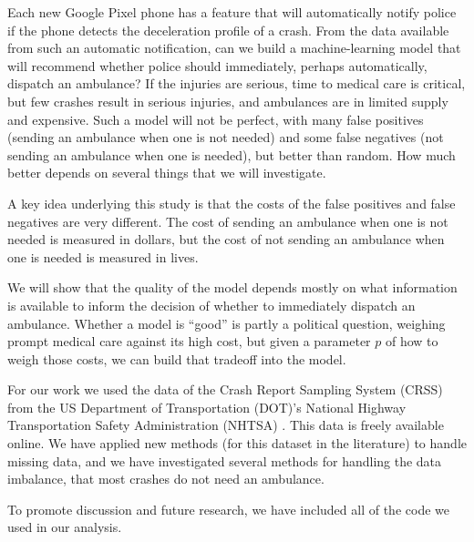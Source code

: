 Each new Google Pixel phone has a feature that will automatically notify police if the phone detects the deceleration profile of a crash.  From the data available from such an automatic notification, can we build a machine-learning model that will recommend whether police should immediately, perhaps automatically, dispatch an ambulance?  If the injuries are serious, time to medical care is critical, but few crashes result in serious injuries, and ambulances are in limited supply and expensive.  Such a model will not be perfect, with many false positives (sending an ambulance when one is not needed) and some false negatives (not sending an ambulance when one is needed), but better than random.  How much better depends on several things that we will investigate.

A key idea underlying this study is that the costs of the false positives and false negatives are very different.  The cost of sending an ambulance when one is not needed is measured in dollars, but the cost of not sending an ambulance when one is needed is measured in lives.  

We will show that the quality of the model depends mostly on what information is available to inform the decision of whether to immediately dispatch an ambulance.  Whether a model is ``good'' is partly a political question, weighing prompt medical care against its high cost, but given a parameter $p$ of how to weigh those costs, we can build that tradeoff into the model.

For our work we used the data of the Crash Report Sampling System (CRSS) from the US Department of Transportation (DOT)'s National Highway Transportation Safety Administration (NHTSA) \cite{CRSS}.  This data is freely available online.  We have applied new methods (for this dataset in the literature) to handle missing data, and we have investigated several methods for handling the data imbalance, that most crashes do not need an ambulance.

To promote discussion and future research, we have included all of the code we used in our analysis.  
